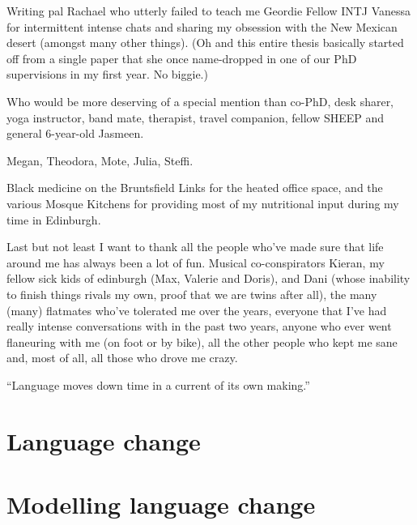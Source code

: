 \documentclass[oneside]{book}
\begin{document}
Writing pal Rachael who utterly failed to teach me Geordie
Fellow INTJ Vanessa for intermittent intense chats and sharing my obsession with the New Mexican desert (amongst many other things). (Oh and this entire thesis basically started off from a single paper that she once name-dropped in one of our PhD supervisions in my first year. No biggie.)

Who would be more deserving of a special mention than co-PhD, desk sharer, yoga instructor, band mate, therapist, travel companion, fellow SHEEP and general 6-year-old Jasmeen.

Megan, Theodora, Mote, Julia, Steffi.

Black medicine on the Bruntsfield Links for the heated office space, and the various Mosque Kitchens for providing most of my nutritional input during my time in Edinburgh.

Last but not least I want to thank all the people who've made sure that life around me has always been a lot of fun. Musical co-conspirators Kieran, my fellow sick kids of edinburgh (Max, Valerie and Doris), and Dani (whose inability to finish things rivals my own, proof that we are twins after all), the many (many) flatmates who've tolerated me over the years, everyone that I've had really intense conversations with in the past two years, anyone who ever went flaneuring with me (on foot or by bike), all the other people who kept me sane and, most of all, all those who drove me crazy.

\tableofcontents

\listoffigures
\listoftables

\newpage
\thispagestyle{empty}
\epigraph{``Language moves down time in a current of its own making.''}{\citep[p.160]{Sapir1921}}

\mainmatter

\chapter{Language change}
\label{ch:review}



\chapter{Modelling language change}
\label{ch:modelling}


\end{document}

